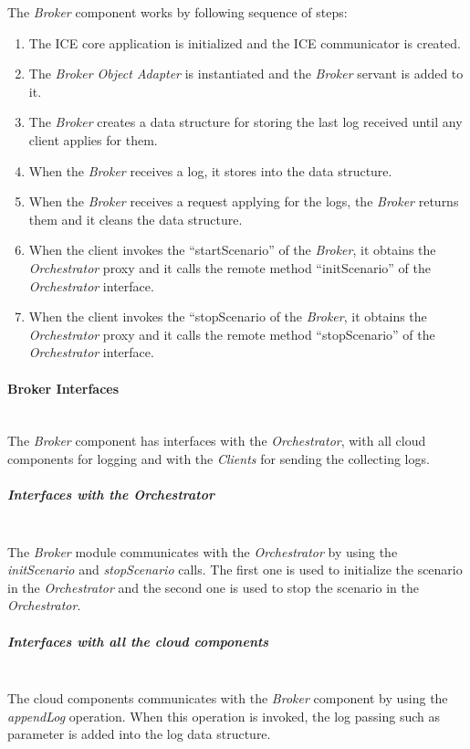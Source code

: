 The \emph{Broker} component works by following  sequence of steps:
\begin{enumerate}
\item The ICE core application is initialized and the ICE communicator is
  created.
\item The \emph{Broker Object Adapter} is instantiated and the \emph{Broker} servant is
  added to it.
\item The  \emph{Broker} creates a data structure for storing the last log
  received until any client applies for them.
\item When the \emph{Broker} receives a log, it stores into the data structure.
\item When the \emph{Broker} receives a request applying for the logs, the
  \emph{Broker} returns them and it cleans the data structure.
\item When the client invokes the ``startScenario'' of the \emph{Broker}, it
  obtains the \emph{Orchestrator} proxy and it calls the remote method
  ``initScenario'' of the \emph{Orchestrator} interface.
\item When the client invokes the ``stopScenario of the \emph{Broker}, it
  obtains the \emph{Orchestrator} proxy and it calls the remote method
  ``stopScenario'' of the \emph{Orchestrator} interface.
\end{enumerate}

\paragraph{Broker Interfaces}~\\

The \emph{Broker} component has interfaces with the \emph{Orchestrator}, with
all cloud components for logging and with the \emph{Clients} for sending the
collecting logs.

\subparagraph{Interfaces with the Orchestrator}~\\

The \emph{Broker} module communicates with the \emph{Orchestrator} by using the
\emph{initScenario} and \emph{stopScenario} calls. The first one is used to
initialize the scenario in the \emph{Orchestrator} and the second one is used
to stop the scenario in the \emph{Orchestrator}.

\subparagraph{Interfaces with all the cloud components}~\\

The cloud components communicates with the \emph{Broker} component by using the
\emph{appendLog} operation. When this operation is invoked, the log passing such
as parameter is added into the log data structure.  

